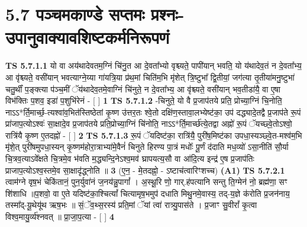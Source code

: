 \documentclass[17pt]{extarticle}
\begin{document}
     \section*{ 5.7      पञ्चमकाण्डे सप्तमः प्रश्नः-उपानुवाक्यावशिष्टकर्मनिरूपणं }
                                        \textbf{ TS 5.7.1.1} \newline
                  यो वा अय॑थादेवतम॒ग्निं चि॑नु॒त आ दे॒वता᳚भ्यो वृश्च्यते॒ पापी॑यान् भवति॒ यो य॑थादेव॒तं न दे॒वता᳚भ्य॒ आ वृ॑श्च्यते॒ वसी॑यान् भवत्याग्ने॒य्या गा॑यत्रि॒या प्र॑थ॒मां चिति॑म॒भि मृ॑शेत् त्रि॒ष्टुभा᳚ द्वि॒तीयां॒ जग॑त्या तृ॒तीया॑मनु॒ष्टुभा॑ चतु॒र्थीं प॒ङ्क्त्या प॑ञ्च॒मीं ॅय॑थादेव॒तमे॒वाग्निं चि॑नुते॒ न दे॒वता᳚भ्य॒ आ वृ॑श्च्यते॒ वसी॑यान् भव॒तीडा॑यै॒ वा ए॒षा विभ॑क्तिः प॒शव॒ इडा॑ प॒शुभि॑रेनं - [  ] \textbf{  1} \newline
                  \newline
                                \textbf{ TS 5.7.1.2} \newline
                  -चिनुते॒ यो वै प्र॒जाप॑तये प्रति॒ प्रोच्या॒ग्निं चि॒नोति॒ नाऽऽ*र्ति॒मार्च्छ॒-त्यश्वा॑व॒भित॑स्तिष्ठेतां कृ॒ष्ण उ॑त्तर॒तः श्वे॒तो दक्षि॑ण॒स्तावा॒लभ्येष्ट॑का॒ उप॑ दद्ध्यादे॒तद्वै प्र॒जाप॑ते रू॒पं प्रा॑जाप॒त्योऽश्वः॑ सा॒क्षादे॒व प्र॒जाप॑तये प्रति॒प्रोच्या॒ग्निं चि॑नोति॒ नाऽऽ*र्ति॒मार्च्छ॑त्ये॒तद्वा अह्नो॑ रू॒पं ॅयच्छ्वे॒तोऽश्वो॒ रात्रि॑यै कृ॒ष्ण ए॒तदह्नो॑ - [  ] \textbf{  2} \newline
                  \newline
                                \textbf{ TS 5.7.1.3} \newline
                  रू॒पं ॅयदिष्ट॑का॒ रात्रि॑यै॒ पुरी॑ष॒मिष्ट॑का उपधा॒स्यञ्छ्वे॒त-मश्व॑म॒भि मृ॑शे॒त् पुरी॑षमुपधा॒स्यन् कृ॒ष्णम॑होरा॒त्राभ्या॑मे॒वैनं॑ चिनुते हिरण्य पा॒त्रं मधोः᳚ पू॒र्णं द॑दाति मध॒व्यो॑ ऽसा॒नीति॑ सौ॒र्या चि॒त्रव॒त्याऽवे᳚क्षते चि॒त्रमे॒व भ॑वति म॒द्ध्यन्दि॒नेऽश्व॒मव॑ घ्रापयत्य॒सौ वा आ॑दि॒त्य इन्द्र॑ ए॒ष प्र॒जाप॑तिः प्राजाप॒त्योऽश्व॒स्तमे॒व सा॒क्षादृ॑द्ध्नोति ॥ \textbf{  3} \newline
                  \newline
                      (ए॒न॒ - मे॒तदह्नो॒ - ऽष्टाच॑त्वारिꣳशच्च)  \textbf{(A1)} \newline \newline
                                        \textbf{ TS 5.7.2.1} \newline
                  त्वाम॑ग्ने वृष॒भं चेकि॑तानं॒ पुन॒र्युवा॑नं ज॒नय॑न्नु॒पागां᳚ । अ॒स्थू॒रि णो॒ गार्.ह॑पत्यानि सन्तु ति॒ग्मेन॑ नो॒ ब्रह्म॑णा॒ सꣳ शि॑शाधि ॥प॒शवो॒ वा ए॒ते यदिष्ट॑का॒श्चित्यां᳚ चित्यामृष॒भमुप॑ दधाति मिथु॒नमे॒वास्य॒ तद्-य॒ज्ञे क॑रोति प्र॒जन॑नाय॒ तस्मा᳚द्-यू॒थेयू॑थ ऋष॒भः ॥ सं॒ॅव॒थ्स॒रस्य॑ प्रति॒मां ॅयां त्वा॑ रात्र्यु॒पास॑ते । प्र॒जाꣳ सु॒वीरां᳚ कृ॒त्वा विश्व॒मायु॒र्व्य॑श्नवत् ॥ प्रा॒जा॒प॒त्या - [  ] \textbf{  4} \newline
\end{document}
